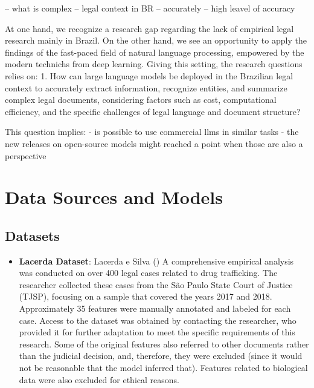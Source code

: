 \documentclass[
  12pt,
]{article}
\providecommand{\tightlist}{%
  \setlength{\itemsep}{0pt}\setlength{\parskip}{0pt}}\usepackage{longtable,booktabs,array}
\begin{document}
-- what is complex -- legal context in BR -- accurately -- high leavel
of accuracy

At one hand, we recognize a research gap regarding the lack of empirical
legal research mainly in Brazil. On the other hand, we see an
opportunity to apply the findings of the fast-paced field of natural
language processing, empowered by the modern technichs from deep
learning. Giving this setting, the research questions relies on: 1. How
can large language models be deployed in the Brazilian legal context to
accurately extract information, recognize entities, and summarize
complex legal documents, considering factors such as cost, computational
eﬀiciency, and the specific challenges of legal language and document
structure?

This question implies: - is possible to use commercial llms in similar
tasks - the new releases on open-source models might reached a point
when those are also a perspective

\section{Data Sources and Models}\label{sec-data_sources_models}

\subsection{Datasets}\label{sec-datasets}

\begin{itemize}
\tightlist
\item
  \textbf{Lacerda Dataset}: Lacerda e Silva
  () A comprehensive
  empirical analysis was conducted on over 400 legal cases related to
  drug trafficking. The researcher collected these cases from the São
  Paulo State Court of Justice (TJSP), focusing on a sample that covered
  the years 2017 and 2018. Approximately 35 features were manually
  annotated and labeled for each case. Access to the dataset was
  obtained by contacting the researcher, who provided it for further
  adaptation to meet the specific requirements of this research. Some of
  the original features also referred to other documents rather than the
  judicial decision, and, therefore, they were excluded (since it would
  not be reasonable that the model inferred that). Features related to
  biological data were also excluded for ethical reasons.
\end{itemize}
\end{document}

